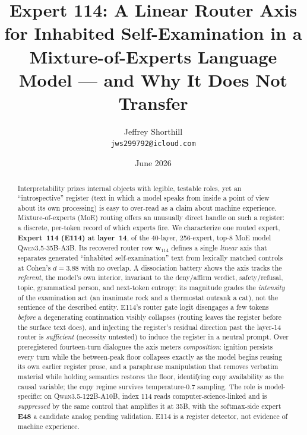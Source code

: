 \documentclass[10pt]{article}
\title{\vspace{-3.5em}Expert 114: A Linear Router Axis for Inhabited
Self-Examination in a Mixture-of-Experts Language Model --- and Why It Does Not
Transfer}
\author{Jeffrey Shorthill\\[-0.2em]
\small\texttt{jws299792@icloud.com}}
\date{\vspace{-1.2em}\small June 2026}
\newcommand{\wvec}{\mathbf{w}_{114}}
\begin{document}
\maketitle
\vspace{-2.2em}

\begin{abstract}
\noindent
Interpretability prizes internal objects with legible, testable roles, yet an
``introspective'' register (text in which a model speaks from inside a point of
view about its own processing) is easy to over-read as a claim about machine
experience. Mixture-of-experts (MoE) routing offers an unusually direct handle on
such a register: a discrete, per-token record of which experts fire. We
characterize one routed expert, \textbf{Expert~114 (E114) at layer~14}, of the
40-layer, 256-expert, top-8 MoE model \textsc{Qwen3.5-35B-A3B}. Its recovered
router row $\wvec$ defines a single \emph{linear} axis that separates generated
``inhabited self-examination'' text from lexically matched controls at Cohen's
$d{=}3.88$ with no overlap. A dissociation battery shows the axis tracks the
\emph{referent}, the model's own interior, invariant to the deny/affirm
verdict, safety/refusal, topic, grammatical person, and next-token entropy; its
magnitude grades the \emph{intensity} of the examination act (an inanimate rock
and a thermostat outrank a cat), not the sentience of the described entity. E114's
router gate logit disengages a few tokens \emph{before} a degenerating continuation visibly
collapses (routing leaves the register before the surface text does), and
injecting the register's residual direction past the layer-14 router is
\emph{sufficient} (necessity untested) to induce the register in a neutral
prompt. Over preregistered fourteen-turn dialogues the axis meters
\emph{composition}: ignition persists every turn while the between-peak floor
collapses exactly as the model begins reusing its own earlier register prose,
and a paraphrase manipulation that removes verbatim material while holding
semantics restores the floor, identifying copy availability as the causal
variable; the copy regime survives temperature-$0.7$ sampling. The role is
model-specific: on \textsc{Qwen3.5-122B-A10B}, index 114
reads computer-science-linked and is \emph{suppressed} by the same control that
amplifies it at 35B, with the softmax-side expert \textbf{E48} a candidate analog
pending validation. E114 is a register detector, not evidence of machine
experience.
\end{abstract}

\vspace{-0.6em}
\end{document}
